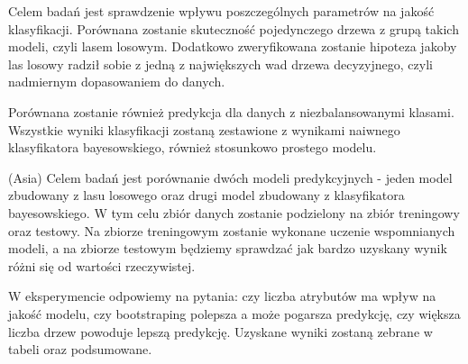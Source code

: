 Celem badań jest sprawdzenie wpływu poszczególnych parametrów na  jakość klasyfikacji. Porównana zostanie skuteczność pojedynczego drzewa z grupą takich modeli, czyli lasem losowym. Dodatkowo zweryfikowana zostanie hipoteza jakoby las losowy radził sobie z jedną z największych wad drzewa decyzyjnego, czyli nadmiernym dopasowaniem do danych.

Porównana zostanie również predykcja dla danych z niezbalansowanymi klasami. Wszystkie wyniki klasyfikacji zostaną zestawione z wynikami naiwnego klasyfikatora bayesowskiego, również stosunkowo prostego modelu.

(Asia)
Celem badań jest porównanie dwóch modeli predykcyjnych - jeden model zbudowany z lasu losowego oraz drugi model zbudowany z klasyfikatora bayesowskiego. W tym celu zbiór danych zostanie podzielony na zbiór treningowy oraz testowy. Na zbiorze treningowym zostanie wykonane uczenie wspomnianych modeli, a na zbiorze testowym będziemy sprawdzać jak bardzo uzyskany wynik różni się od wartości rzeczywistej.

W eksperymencie odpowiemy na pytania: czy liczba atrybutów ma wpływ na jakość modelu, czy bootstraping polepsza a może pogarsza predykcję, czy większa liczba drzew powoduje lepszą predykcję. Uzyskane wyniki zostaną zebrane w tabeli oraz podsumowane.